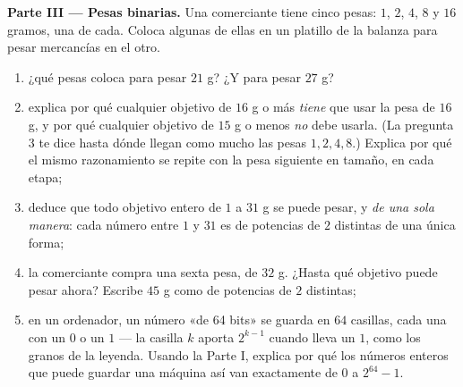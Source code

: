 \begin{problem}[{Problema de fin de semana --- la \omterm{def:g1:addition:def}{suma} geométrica
$1 + 2 + 4 + \dots + 2^{n-1} = 2^n - 1$, de una leyenda famosa a
los números binarios}]
\medskip
\noindent\textbf{Parte III --- Pesas binarias.}
Una comerciante tiene cinco pesas: $1$, $2$, $4$, $8$ y $16$ gramos,
una de cada. Coloca algunas de ellas en un platillo de la balanza para
pesar mercancías en el otro.
\begin{enumerate}[resume]
  \item ¿qué pesas coloca para pesar $21$ g? ¿Y para pesar
        $27$ g?
  \item explica por qué cualquier objetivo de $16$ g o más \emph{tiene} que usar
        la pesa de $16$ g, y por qué cualquier objetivo de $15$ g o menos
        \emph{no} debe usarla. (La pregunta 3 te dice hasta dónde llegan
        como mucho las pesas $1, 2, 4, 8$.) Explica por qué el
        mismo razonamiento se repite con la pesa siguiente en tamaño, en
        cada etapa;
  \item deduce que todo objetivo entero de $1$ a $31$ g se puede
        pesar, y \emph{de una sola manera}: cada número
        entre $1$ y $31$ es  de potencias de $2$ distintas de
        una única forma;
  \item la comerciante compra una sexta pesa, de $32$ g. ¿Hasta qué
        objetivo puede pesar ahora? Escribe $45$ g como  de
        potencias de $2$ distintas;
  \item en un ordenador, un número «de 64 bits» se guarda en $64$
        casillas, cada una con un $0$ o un $1$ --- la casilla $k$
        aporta $2^{k-1}$ cuando lleva un $1$, como los
        granos de la leyenda. Usando la Parte I, explica por qué los números
        enteros que puede guardar una máquina así van exactamente de $0$ a
        $2^{64} - 1$.
\end{enumerate}
\end{problem}
